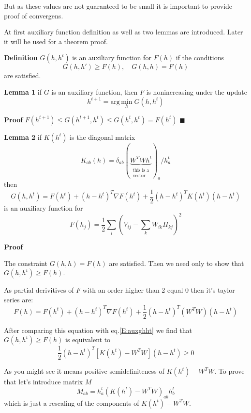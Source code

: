 \documentclass{extreport}
\begin{document}
But as these values are not guaranteed to be small it is important
to provide proof of convergens.

At first auxiliary function definition as well as two lemmas
are introduced. Later it will be used
for a theorem proof.

\textbf{Definition} $G(h,h^t)$ is an auxiliary function for $F(h)$ if the
conditions
\[
  G(h,h') \geqslant F(h), \quad G(h,h) = F(h)
\]
are satisfied.

\textbf{Lemma 1} if $G$ is an auxiliary function,
then $F$ is nonincreasing under the update
\[
  h^{t+1} = \text{arg} \, \underset{h}{\text{min}} \; G(h,h^t)
\]

\textbf{Proof}
$F(h^{t+1}) \leqslant G(h^{t+1},h^t) \leqslant G(h^t,h^t) = F(h^t)$
$\blacksquare$

\textbf{Lemma 2} if $K(h^t)$ is the diagonal matrix
\[
  K_{ab}(h) =
  \delta_{ab}
  (\underbrace{W^T W h^t}
    _{\substack{\text{this is a}\\ \text{vector}}}
  )_a / h_a^t
\]
then
\begin{equation}\label{E:auxghht}
  G(h,h^t) = F(h^t) + (h - h^t)^T \nabla F(h^t)
    + \frac{1}{2} (h - h^t)^T K(h^t) (h - h^t)
\end{equation}
is an auxiliary function for
\[
  F(h_j) = \frac{1}{2} \sum_{i}
  \left(
    V_{ij} - \sum_{k}W_{ik}H_{kj}
  \right)^2
\]

\textbf{Proof}

The constraint $G(h,h) = F(h)$ are satisfied. Then we need only
to show that $G(h,h^t) \geqslant F(h)$.

As partial derivitives of $F$ with an order higher than 2 equal
0 then it's taylor series are:
\begin{equation}\label{E:f_taylor}
  F(h) = F(h^t) + (h - h^t)^T \nabla F(h^t)
    + \frac{1}{2} (h - h^t)^T (W^TW) (h - h^t)
\end{equation}

After comparing this equation with eq.\eqref{E:auxghht} we find that
$G(h,h^t) \geqslant F(h)$ is equivalent to
\[
  \frac{1}{2} (h - h^t)^T \left[K(h^t) - W^TW\right] (h - h^t) \geqslant 0
\]

As you might see it means positive semidefiniteness of $K(h^t) - W^TW$.
To prove that let's introduce matrix $M$
\begin{equation}
  M_{ab} = h_a^t (K(h^t) - W^T W)_{ab} h_b^t
\end{equation}
which is just a rescaling of the components of $K(h^t) - W^TW$.
\end{document}
